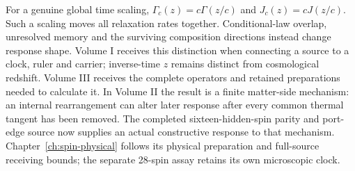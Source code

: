 For a genuine global time scaling, $\Gamma_c(z)=c\Gamma(z/c)$ and $J_c(z)=cJ(z/c)$. Such a scaling moves all relaxation rates together. Conditional-law overlap, unresolved memory and the surviving composition directions instead change response shape. Volume I receives this distinction when connecting a source to a clock, ruler and carrier; inverse-time $z$ remains distinct from cosmological redshift. Volume III receives the complete operators and retained preparations needed to calculate it. In Volume II the result is a finite matter-side mechanism: an internal rearrangement can alter later response after every common thermal tangent has been removed. The completed sixteen-hidden-spin parity and port-edge source now supplies an actual constructive response to that mechanism. Chapter~\ref{ch:spin-physical} follows its physical preparation and full-source receiving bounds; the separate 28-spin assay retains its own microscopic clock.
